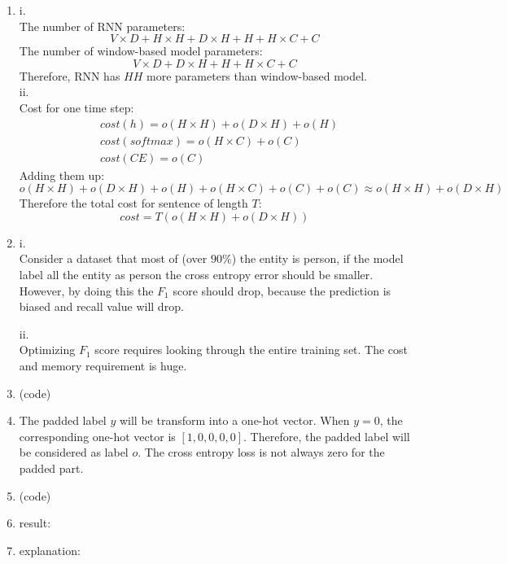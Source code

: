 \documentclass[10pt]{article}
\begin{document}
\begin{enumerate}[label=(\alph*)]
\item
i.\\
The number of RNN parameters:
$$
V \times D + H \times H + D \times H + H + H \times C + C
$$
The number of window-based model parameters:
$$
V \times D + D \times H + H + H \times C + C
$$
Therefore, RNN has $HH$ more parameters than window-based model.\\

ii.\\
Cost for one time step:
$$
\begin{aligned}
& cost(h) = o(H \times H) + o(D \times H) + o(H)\\
& cost(softmax) = o(H \times C) + o(C)\\
& cost(CE) = o(C)
\end{aligned}
$$
Adding them up:
$$
o(H \times H) + o(D \times H) + o(H) + o(H \times C) + o(C) + o(C) \approx o(H \times H) + o(D \times H)
$$
Therefore the total cost for sentence of length $T$:
$$
cost = T(o(H \times H) + o(D \times H))
$$

\item
i.\\
Consider a dataset that most of (over $90\%$) the entity is person,
if the model label all the entity as person the cross entropy error should be smaller.
However, by doing this the $F_1$ score should drop, because the prediction is biased and recall value will drop.

ii.\\
Optimizing $F_1$ score requires looking through the entire training set. The cost and memory requirement is huge.

\item
(code)

\item
The padded label $y$ will be transform into a one-hot vector.
When $y=0$, the corresponding one-hot vector is $[1, 0, 0, 0, 0]$.
Therefore, the padded label will be considered as label $o$.
The cross entropy loss is not always zero for the padded part.

\item
(code)

\item
result:

\item
explanation:

\end{enumerate}
\end{document}

